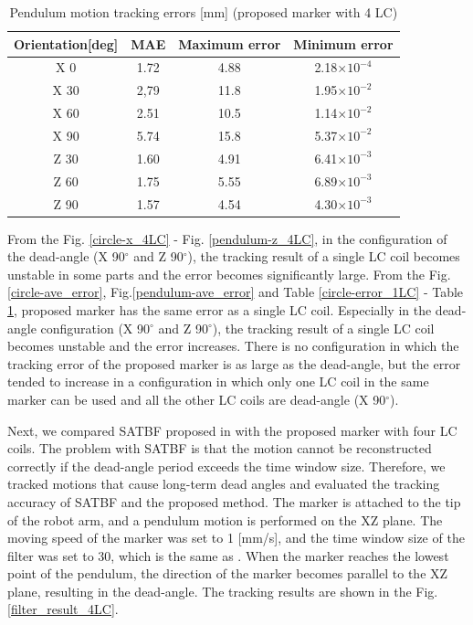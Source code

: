 \documentclass[journal,twoside,web]{ieeecolor}
\begin{document}
\begin{table}[t]
  \begin{center}
  \caption{Pendulum motion tracking errors [mm] (proposed marker with 4 LC)}
  \label{pendulum-error_4LC}
  \begin{tabular}{c||c|c|c} \hline
    Orientation[deg] & MAE & Maximum error & Minimum error\\ \hline\hline
    X 0 & 1.72 & 4.88 & 2.18$\times10^{-4}$ \\
    X 30 & 2,79 & 11.8 & 1.95$\times10^{-2}$ \\
    X 60 & 2.51 & 10.5 & 1.14$\times10^{-2}$ \\
    X 90 & 5.74 & 15.8 & 5.37$\times10^{-2}$  \\
    Z 30 & 1.60 & 4.91 & 6.41$\times10^{-3}$ \\
    Z 60 & 1.75 & 5.55 & 6.89$\times10^{-3}$ \\
    Z 90 & 1.57 & 4.54 & 4.30$\times10^{-3}$ \\
  \end{tabular}
  \end{center}
\end{table}

From the Fig. \ref{circle-x_4LC} - Fig. \ref{pendulum-z_4LC}, in the configuration of the dead-angle (X 90$^\circ$ and Z 90$^\circ$), the tracking result of a single LC coil becomes unstable in some parts and the error becomes significantly large. From the Fig.\ref{circle-ave_error}, Fig.\ref{pendulum-ave_error} and Table \ref{circle-error_1LC} - Table \ref{pendulum-error_4LC}, proposed marker has the same error as a single LC coil. Especially in the dead-angle configuration (X 90$^\circ$ and Z 90$^\circ$), the tracking result of a single LC coil becomes unstable and the error increases. There is no configuration in which the tracking error of the proposed marker is as large as the dead-angle, but the error tended to increase in a configuration in which only one LC coil in the same marker can be used and all the other LC coils are dead-angle (X 90$^\circ$).

Next, we compared SATBF proposed in \cite{im3d+} with the proposed marker with four LC coils. The problem with SATBF is that the motion cannot be reconstructed correctly if the dead-angle period exceeds the time window size. Therefore, we tracked motions that cause long-term dead angles and evaluated the tracking accuracy of SATBF and the proposed method. The marker is attached to the tip of the robot arm, and a pendulum motion is performed on the XZ plane. The moving speed of the marker was set to 1 [mm/s], and the time window size of the filter was set to 30, which is the same as \cite{im3d+}. When the marker reaches the lowest point of the pendulum, the direction of the marker becomes parallel to the XZ plane, resulting in the dead-angle. The tracking results are shown in the Fig. \ref{filter_result_4LC}.
\end{document}
